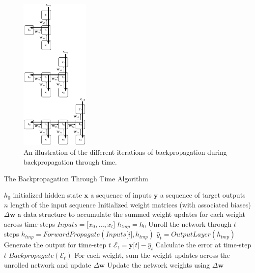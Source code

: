 \documentclass[xcolor={table}]{beamer}
\begin{document}
 \begin{frame}[plain]
\begin{figure}[t]
\centerline{
\includegraphics[width=0.3\textwidth]{./images/fmlpda_8_39.pdf}
}
\caption{An illustration of the different iterations of backpropagation during backpropagation through time.}
\label{fig:bptt}
\end{figure}
\end{frame} 


\begin{frame}[plain]
\begin{algorithm}[H]
\tiny
\caption[The Backpropagation Through Time Algorithm]{The Backpropagation Through Time Algorithm}
\begin{algorithmic}[1]
\Require $h_0$ initialized hidden state
\Require $\mathbf{x}$ a sequence of inputs
\Require $\mathbf{y}$ a sequence of target outputs 
\Require $n$ length of the input sequence
\Require Initialized weight matrices (with associated biases)
\Require $\Delta \mathbf{w}$ a data structure to accumulate the summed weight updates for each weight across time-steps
	\State $Inputs = \lbrack x_0, \dots, x_t \rbrack$
	\State $h_{tmp} = h_0$
	\Comment Unroll the network through $t$ steps
		\State $h_{tmp} = ForwardPropagate(Inputs\lbrack i \rbrack,h_{tmp})$
	\EndFor
	\State $\hat{y}_t = OutputLayer(h_{tmp})$
	\Comment Generate the output for time-step $t$
	\State $\mathcal{E}_t = \mathbf{y}\lbrack t\rbrack - \hat{y}_t$
	\Comment Calculate the error at time-step $t$
	\State $Backpropagate(\mathcal{E}_t)$ 
	\State For each weight, sum the weight updates across the unrolled network and update $\Delta \mathbf{w}$	
\EndFor
\State Update the network weights using $\Delta \mathbf{w}$
\end{algorithmic}
\label{alg:bptt}
\end{algorithm}
\end{frame}
\end{document}
